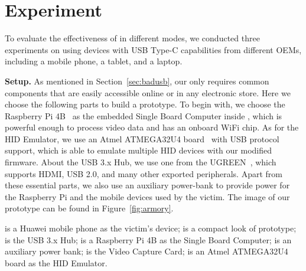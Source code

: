 \section{Experiment}
\label{sec:experiment}


To evaluate the effectiveness of \tool in different modes, we conducted three
experiments on \tool using devices with USB Type-C capabilities from different
OEMs, including a mobile phone, a tablet, and a laptop.

\textbf{Setup.}
As mentioned in Section~\ref{sec:badusb},
our \tool only requires common components that are easily accessible online or
in any electronic store. Here we choose the following parts to build a
prototype. To begin with, we choose the Raspberry Pi 4B~\cite{pi4b} as the embedded Single Board
Computer inside \tool, which is powerful enough to process video data and has
an onboard WiFi chip. As for the HID Emulator, we use an Atmel ATMEGA32U4 board~\cite{atmel}
with USB protocol support, which is able to emulate multiple HID devices
with our modified firmware. About the USB 3.x Hub, we use one from the
UGREEN~\cite{ugreen}, which supports HDMI, USB 2.0, and many other exported peripherals.
Apart from these essential parts, we also use an auxiliary power-bank to
provide power for the Raspberry Pi and the mobile devices used by the victim.
The image of our \tool prototype can be found in Figure~\ref{fig:armory}.

 is a Huawei mobile phone as the victim's device;  is a compact look of \tool prototype;  is the USB 3.x Hub;  is a Raspberry Pi 4B as the Single Board Computer;  is an auxiliary power bank;  is the Video Capture Card;  is an Atmel ATMEGA32U4 board as the HID Emulator.


